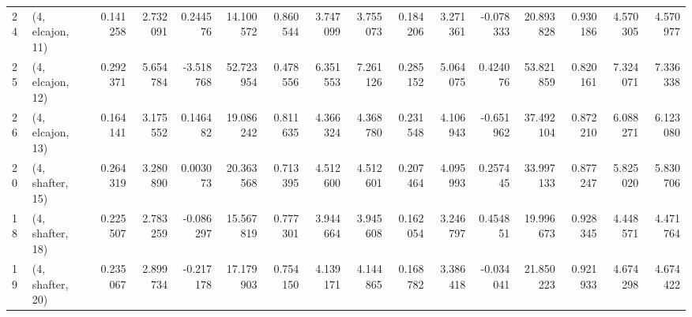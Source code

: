 \begin{tabular}{llrrrrrrrrrrrrrr}
24 &  (4, elcajon, 11) &   0.141258 &  2.732091 &  0.244576 &  14.100572 &  0.860544 &   3.747099 &  3.755073 &  0.184206 &  3.271361 & -0.078333 &   20.893828 &  0.930186 &   4.570305 &   4.570977 \\
25 &  (4, elcajon, 12) &   0.292371 &  5.654784 & -3.518768 &  52.723954 &  0.478556 &   6.351553 &  7.261126 &  0.285152 &  5.064075 &  0.424076 &   53.821859 &  0.820161 &   7.324071 &   7.336338 \\
26 &  (4, elcajon, 13) &   0.164141 &  3.175552 &  0.146482 &  19.086242 &  0.811635 &   4.366324 &  4.368780 &  0.231548 &  4.106943 & -0.651962 &   37.492104 &  0.872210 &   6.088271 &   6.123080 \\
20 &  (4, shafter, 15) &   0.264319 &  3.280890 &  0.003073 &  20.363568 &  0.713395 &   4.512600 &  4.512601 &  0.207464 &  4.095993 &  0.257445 &   33.997133 &  0.877247 &   5.825020 &   5.830706 \\
18 &  (4, shafter, 18) &   0.225507 &  2.783259 & -0.086297 &  15.567819 &  0.777301 &   3.944664 &  3.945608 &  0.162054 &  3.246797 &  0.454851 &   19.996673 &  0.928345 &   4.448571 &   4.471764 \\
19 &  (4, shafter, 20) &   0.235067 &  2.899734 & -0.217178 &  17.179903 &  0.754150 &   4.139171 &  4.144865 &  0.168782 &  3.386418 & -0.034041 &   21.850223 &  0.921933 &   4.674298 &   4.674422 \\
\bottomrule
\end{tabular}
